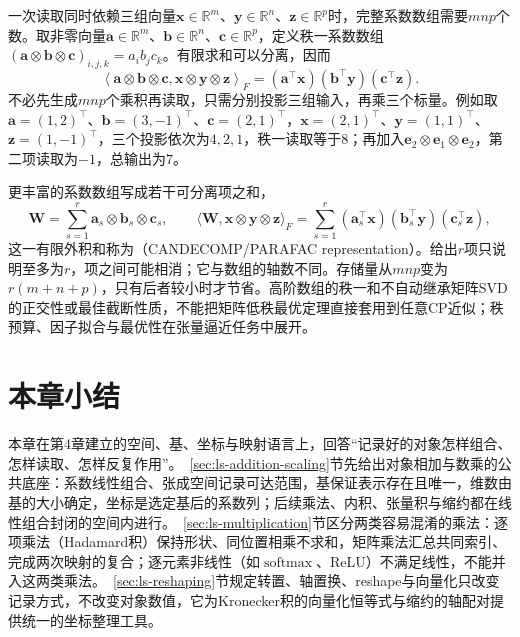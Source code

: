 一次读取同时依赖三组向量$\bm x\in\mathbb R^m$、$\bm y\in\mathbb R^n$、$\bm z\in\mathbb R^p$时，完整系数数组需要$mnp$个数。取非零向量$\bm a\in\mathbb R^m$、$\bm b\in\mathbb R^n$、$\bm c\in\mathbb R^p$，定义秩一系数数组$(\bm a\otimes\bm b\otimes\bm c)_{i,j,k}=a_i b_j c_k$。有限求和可以分离，因而
\begin{equation}
 \left\langle\bm a\otimes\bm b\otimes\bm c,
 \bm x\otimes\bm y\otimes\bm z\right\rangle_F
 =(\bm a^\top\bm x)(\bm b^\top\bm y)(\bm c^\top\bm z).
 \label{eq:linear-algebra-rank-one-contraction}
\end{equation}
不必先生成$mnp$个乘积再读取，只需分别投影三组输入，再乘三个标量。例如取$\bm a=(1,2)^\top$、$\bm b=(3,-1)^\top$、$\bm c=(2,1)^\top$，$\bm x=(2,1)^\top$、$\bm y=(1,1)^\top$、$\bm z=(1,-1)^\top$，三个投影依次为$4,2,1$，秩一读取等于$8$；再加入$\bm e_2\otimes\bm e_1\otimes\bm e_2$，第二项读取为$-1$，总输出为$7$。

更丰富的系数数组写成若干可分离项之和，
\begin{equation}
 \bm W=\sum_{s=1}^r\bm a_s\otimes\bm b_s\otimes\bm c_s,\qquad
 \langle\bm W,\bm x\otimes\bm y\otimes\bm z\rangle_F
 =\sum_{s=1}^r(\bm a_s^\top\bm x)(\bm b_s^\top\bm y)(\bm c_s^\top\bm z),
 \label{eq:linear-algebra-cp-reading}
\end{equation}
这一有限外积和称为（CANDECOMP/PARAFAC representation）。给出$r$项只说明至多为$r$，项之间可能相消；它与数组的轴数不同。存储量从$mnp$变为$r(m+n+p)$，只有后者较小时才节省。高阶数组的秩一和不自动继承矩阵SVD的正交性或最佳截断性质，不能把矩阵低秩最优定理直接套用到任意CP近似；秩预算、因子拟合与最优性在张量逼近任务中展开。

\section{本章小结}
\label{sec:ls-operations-summary}

本章在第4章建立的空间、基、坐标与映射语言上，回答“记录好的对象怎样组合、怎样读取、怎样反复作用”。~\ref{sec:ls-addition-scaling}节先给出对象相加与数乘的公共底座：系数线性组合、张成空间记录可达范围，基保证表示存在且唯一，维数由基的大小确定，坐标是选定基后的系数列；后续乘法、内积、张量积与缩约都在线性组合封闭的空间内进行。~\ref{sec:ls-multiplication}节区分两类容易混淆的乘法：逐项乘法（Hadamard积）保持形状、同位置相乘不求和，矩阵乘法汇总共同索引、完成两次映射的复合；逐元素非线性（如$\operatorname{softmax}$、ReLU）不满足线性，不能并入这两类乘法。~\ref{sec:ls-reshaping}节规定转置、轴置换、reshape与向量化只改变记录方式，不改变对象数值，它为Kronecker积的向量化恒等式与缩约的轴配对提供统一的坐标整理工具。

